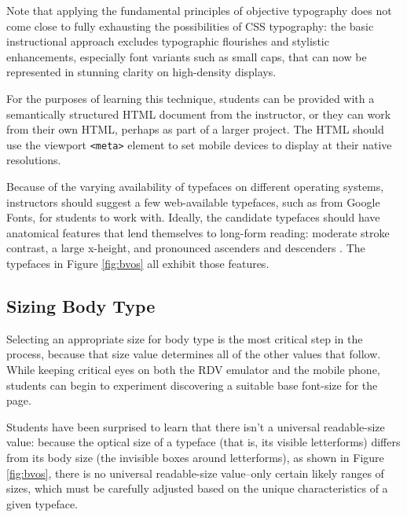 \documentclass[sigplan,screen]{acmart}
\begin{document}
Note that applying the fundamental principles of objective typography does not come close to fully exhausting the possibilities of CSS typography: the basic instructional approach excludes typographic flourishes and stylistic enhancements, especially font variants such as small caps, that can now be represented in stunning clarity on high-density displays.

For the purposes of learning this technique, students can be provided with a semantically structured HTML document from the instructor, or they can work from their own HTML, perhaps as part of a larger project. The HTML should use the viewport \verb|<meta>| element to set mobile devices to display at their native resolutions.

Because of the varying availability of typefaces on different operating systems, instructors should suggest a few web-available typefaces, such as from Google Fonts, for students to work with. Ideally, the candidate typefaces should have anatomical features that lend themselves to long-form reading: moderate stroke contrast, a large x-height, and pronounced ascenders and descenders \cite[p.~36]{jsm:owt}. The typefaces in Figure \ref{fig:bvos} all exhibit those features.

\subsection{Sizing Body Type}

Selecting an appropriate size for body type is the most critical step in the process, because that size value determines all of the other values that follow. While keeping critical eyes on both the RDV emulator and the mobile phone, students can begin to experiment discovering a suitable base font-size for the page.

Students have been surprised to learn that there isn’t a universal readable-size value: because the optical size of a typeface (that is, its visible letterforms) differs from its body size (the invisible boxes around letterforms), as shown in Figure \ref{fig:bvos}, there is no universal readable-size value--only certain likely ranges of sizes, which must be carefully adjusted based on the unique characteristics of a given typeface.
\end{document}

